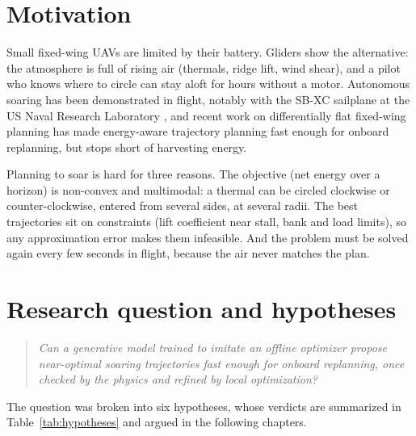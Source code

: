 \documentclass[11pt,a4paper,oneside]{report}
\begin{document}
\section{Motivation}
Small fixed-wing UAVs are limited by their battery. Gliders show the alternative: the atmosphere is full of rising air (thermals, ridge lift, wind shear), and a pilot who knows where to circle can stay aloft for hours without a motor. Autonomous soaring has been demonstrated in flight, notably with the SB-XC sailplane at the US Naval Research Laboratory \cite{edwards2008}, and recent work on differentially flat fixed-wing planning \cite{morando2025,morando2026} has made energy-aware trajectory planning fast enough for onboard replanning, but stops short of harvesting energy.

Planning to soar is hard for three reasons. The objective (net energy over a horizon) is non-convex and multimodal: a thermal can be circled clockwise or counter-clockwise, entered from several sides, at several radii. The best trajectories sit on constraints (lift coefficient near stall, bank and load limits), so any approximation error makes them infeasible. And the problem must be solved again every few seconds in flight, because the air never matches the plan.

\section{Research question and hypotheses}
\begin{quote}\itshape
Can a generative model trained to imitate an offline optimizer propose near-optimal soaring trajectories fast enough for onboard replanning, once checked by the physics and refined by local optimization?
\end{quote}
The question was broken into six hypotheses, whose verdicts are summarized in Table~\ref{tab:hypotheses} and argued in the following chapters.
\end{document}
